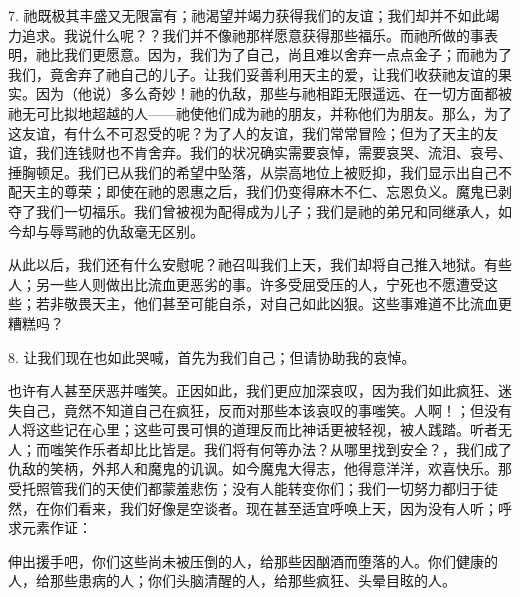 7. 祂既极其丰盛又无限富有；祂渴望并竭力获得我们的友谊；我们却并不如此竭力追求。我说什么呢？？我们并不像祂那样愿意获得那些福乐。而祂所做的事表明，祂比我们更愿意。因为，我们为了自己，尚且难以舍弃一点点金子；而祂为了我们，竟舍弃了祂自己的儿子。让我们妥善利用天主的爱，让我们收获祂友谊的果实。因为（他说）多么奇妙！祂的仇敌，那些与祂相距无限遥远、在一切方面都被祂无可比拟地超越的人——祂使他们成为祂的朋友，并称他们为朋友。那么，为了这友谊，有什么不可忍受的呢？为了人的友谊，我们常常冒险；但为了天主的友谊，我们连钱财也不肯舍弃。我们的状况确实需要哀悼，需要哀哭、流泪、哀号、捶胸顿足。我们已从我们的希望中坠落，从崇高地位上被贬抑，我们显示出自己不配天主的尊荣；即使在祂的恩惠之后，我们仍变得麻木不仁、忘恩负义。魔鬼已剥夺了我们一切福乐。我们曾被视为配得成为儿子；我们是祂的弟兄和同继承人，如今却与辱骂祂的仇敌毫无区别。\par

从此以后，我们还有什么安慰呢？祂召叫我们上天，我们却将自己推入地狱。有些人；另一些人则做出比流血更恶劣的事。许多受屈受压的人，宁死也不愿遭受这些；若非敬畏天主，他们甚至可能自杀，对自己如此凶狠。这些事难道不比流血更糟糕吗？\par

8. 让我们现在也如此哭喊，首先为我们自己；但请协助我的哀悼。\par

也许有人甚至厌恶并嗤笑。正因如此，我们更应加深哀叹，因为我们如此疯狂、迷失自己，竟然不知道自己在疯狂，反而对那些本该哀叹的事嗤笑。人啊！；但没有人将这些记在心里；这些可畏可惧的道理反而比神话更被轻视，被人践踏。听者无人；而嗤笑作乐者却比比皆是。我们将有何等办法？从哪里找到安全？，我们成了仇敌的笑柄，外邦人和魔鬼的讥讽。如今魔鬼大得志，他得意洋洋，欢喜快乐。那受托照管我们的天使们都蒙羞悲伤；没有人能转变你们；我们一切努力都归于徒然，在你们看来，我们好像是空谈者。现在甚至适宜呼唤上天，因为没有人听；呼求元素作证：\par

伸出援手吧，你们这些尚未被压倒的人，给那些因酗酒而堕落的人。你们健康的人，给那些患病的人；你们头脑清醒的人，给那些疯狂、头晕目眩的人。\par

